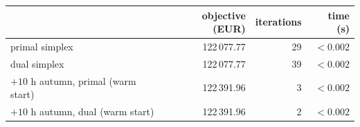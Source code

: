 \begin{center}\footnotesize
\begin{tabular}{lrrr}
\toprule
 & objective (EUR) & iterations & time (s)\\
\midrule
primal simplex & 122\,077.77 & 29 & $<0.002$\\
dual simplex   & 122\,077.77 & 39 & $<0.002$\\
\midrule
$+10$ h autumn, primal (warm start) & 122\,391.96 & 3 & $<0.002$\\
$+10$ h autumn, dual (warm start)   & 122\,391.96 & 2 & $<0.002$\\
\bottomrule
\end{tabular}
\end{center}

